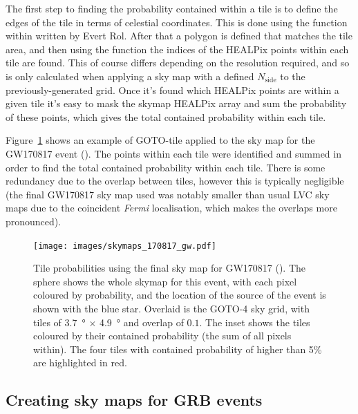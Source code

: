\begin{colsection}
\begin{colsection}
The first step to finding the probability contained within a tile is to define the edges of the tile in terms of celestial coordinates. This is done using the  function within  written by Evert Rol. After that a polygon is defined that matches the tile area, and then using the   function the indices of the HEALPix points within each tile are found. This of course differs depending on the resolution required, and so is only calculated when applying a sky map with a defined $N_\text{side}$ to the previously-generated grid. Once it's found which HEALPix points are within a given tile it's easy to mask the skymap HEALPix array and sum the probability of these points, which gives the total contained probability within each tile.

Figure~\ref{fig:170817_gw} shows an example of GOTO-tile applied to the sky map for the GW170817 event (\cite{GW170817}). The points within each tile were identified and summed in order to find the total contained probability within each tile. There is some redundancy due to the overlap between tiles, however this is typically negligible (the final GW170817 sky map used was notably smaller than usual LVC sky maps due to the coincident \textit{Fermi} localisation, which makes the overlaps more pronounced).

\begin{figure}[p]
\begin{center}
\texttt{[image: images/skymaps\_170817\_gw.pdf]}
\end{center}
\caption[Tile probabilities for GW170817]{Tile probabilities using the final sky map for GW170817 (\cite{GW170817}). The sphere shows the whole skymap for this event, with each pixel coloured by probability, and the location of the source of the event is shown with the blue star. Overlaid is the GOTO-4 sky grid, with tiles of \SI{3.7}{\degree} $\times$ \SI{4.9}{\degree} and overlap of $0.1$. The inset shows the tiles coloured by their contained probability (the sum of all pixels within). The four tiles with contained probability of higher than 5\% are highlighted in red.
}
\label{fig:170817_gw}
\end{figure}

\newpage

\end{colsection}


\subsection{Creating sky maps for GRB events}
\label{sec:gaussian_skymaps}
\begin{colsection}


\end{colsection}
\end{colsection}

